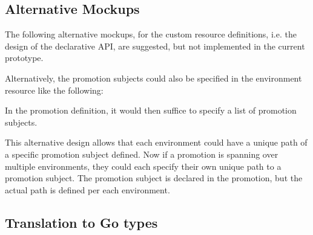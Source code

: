 \subsection{Alternative Mockups}
\label{prototype:design:alternative-mockups}

The following alternative mockups,
for the custom resource definitions,
i.e. the design of the declarative API,
are suggested, but not implemented in the current prototype.


Alternatively, the promotion subjects could also be specified
in the environment resource like the following:

\newpage



In the promotion definition,
it would then suffice to specify
a list of promotion subjects.



This alternative design allows that each environment could have
a unique path of a specific promotion subject defined.
Now if a promotion is spanning over multiple environments,
they could each specify their own unique path to a promotion subject.
The promotion subject is declared in the promotion,
but the actual path is defined per each environment.

\subsection{Translation to Go types}
\label{prototype:design:go-types}

